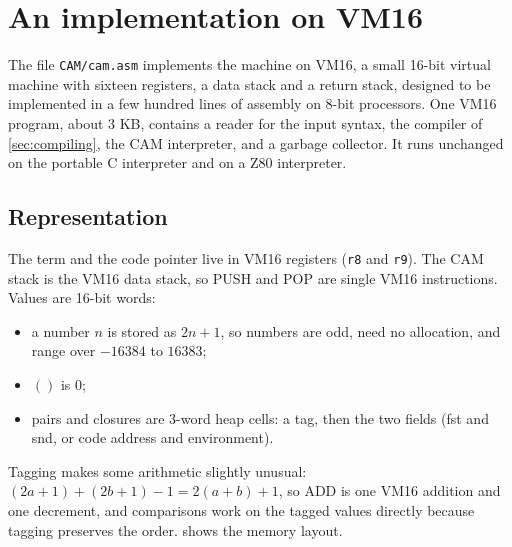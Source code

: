 \documentclass[11pt,a4paper]{article}
\newcommand{\ins}[1]{\textsf{#1}}
\newcommand{\unit}{()}
\theoremstyle{definition}
\theoremstyle{plain}
\begin{document}
\section{An implementation on VM16}\label{sec:vm16}

The file \texttt{CAM/cam.asm} implements the machine on VM16, a small
16-bit virtual machine with sixteen registers, a data stack and a return
stack, designed to be implemented in a few hundred lines of assembly on
8-bit processors. One VM16 program, about 3 KB, contains a reader for the
input syntax, the compiler of \cref{sec:compiling}, the CAM interpreter, and a
garbage collector. It runs unchanged on the portable C interpreter and on a
Z80 interpreter.

\subsection{Representation}

The term and the code pointer live in VM16 registers (\texttt{r8} and
\texttt{r9}). The CAM stack is the VM16 data stack, so \ins{PUSH} and \ins{POP}
are single VM16 instructions. Values are 16-bit words:
\begin{itemize}[itemsep=1pt]
\item a number $n$ is stored as $2n+1$, so numbers are odd, need no
  allocation, and range over $-16384$ to $16383$;
\item $\unit$ is 0;
\item pairs and closures are 3-word heap cells: a tag, then the two fields
  (fst and snd, or code address and environment).
\end{itemize}
Tagging makes some arithmetic slightly unusual: $(2a+1)+(2b+1)-1 = 2(a+b)+1$,
so \ins{ADD} is one VM16 addition and one decrement, and comparisons work on
the tagged values directly because tagging preserves the order.
 shows the memory layout.
\end{document}
